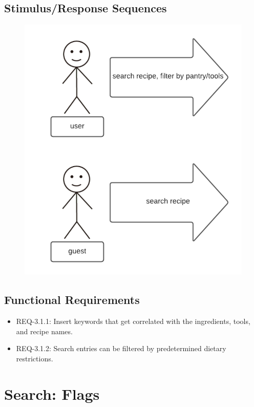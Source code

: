 \documentclass{scrreprt}
\begin{document}
\subsection{Stimulus/Response Sequences}

\begin{figure}[H]\centering
    \includegraphics[width=\columnwidth]{response diagrams/Search.png}
\end{figure}

\subsection{\gls{Functional Requirements}}

\begin{itemize}
    \item REQ-3.1.1: Insert keywords that get correlated with the ingredients, tools, and recipe names.
    \item REQ-3.1.2: Search entries can be filtered by predetermined dietary restrictions.
\end{itemize}

\section{Search: Flags}
\end{document}
